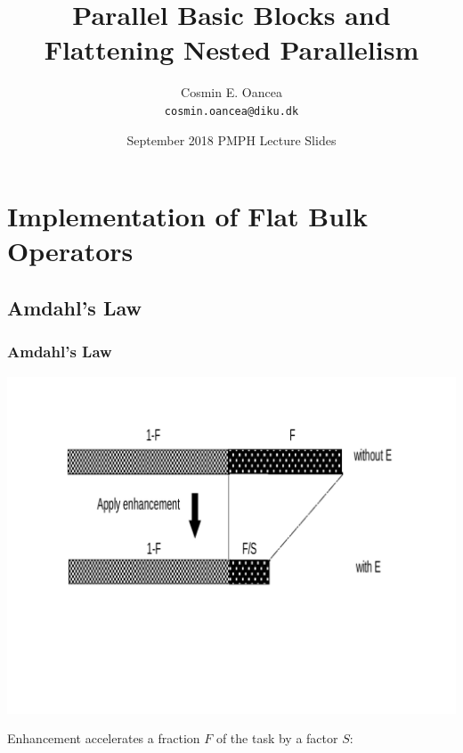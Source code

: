 \documentclass{beamer}
\title[Intro]{Parallel Basic Blocks and\\ Flattening Nested Parallelism}
\author[C.~Oancea]{Cosmin E. Oancea\\{\tt cosmin.oancea@diku.dk}}
\institute{Department of Computer Science (DIKU)\\University of Copenhagen}
\date[Sept 2018]{September 2018 PMPH Lecture Slides}
\begin{document}
\titleslide


\begin{frame}[fragile]
	\tableofcontents
\end{frame}



\section{Implementation of Flat Bulk Operators}

\subsection{Amdahl's Law}

\begin{frame}[fragile,t]
\frametitle{Amdahl's Law}
\vspace{-5ex}
\includegraphics[width=47ex]{Figures/L1/Amdhal}
\vspace{-7ex}

Enhancement accelerates a fraction $F$ of the task by a factor $S$:\bigskip

\bigskip


\end{frame}
\end{document}
